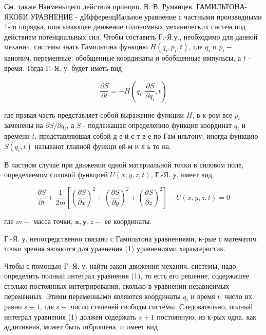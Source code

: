 \documentclass[10pt]{article}
\begin{document}
См. также Наименьщего действия принцип. В. В. Румянцев. ГАМИЛЬТОНА-ЯКОБИ УРАВНЕНИЕ - дИфференцИальное уравнение с частными производными 1-го порядка, описывающее движение голономных механических систем под действием потенциальных сил. Чтобы составить Г.-Я.у., необходимо для данной механич. системы знать Гамильтона функцию $H\left(q_{i}, p_{i}, t\right)$, где $q_{i}$ и $p_{i}-$ канонич. переменные: обобщенные координаты и обобщенные импульсы, а $t$ - время. Тогда Г.-Я. у. будет иметь вид



\[

\frac{\partial S}{\partial t}=-H\left(q_{i}, \frac{\partial S}{\partial q_{i}}, t\right)

\]



где правая часть представляет собой выражение функции $H$, в к-ром все $p_{i}$ заменены на $\partial S / \partial q_{i}$, а $S$ - подлежащая определению функция координат $q_{i}$ и времени $t$, представляюшая собой д е й с т в е по Гам ильтону; иногда функцию $S\left(q_{i}, t\right)$ называют главной функци ей м и л ь то на.



В частном случае при движении одной материальной точки в силовом поле, определяемом силовой функцией $U(x, y, z, t)$, Г.-Я. у. имеет вид



\[

\frac{\partial S}{\partial t}+\frac{1}{2 m}\left[\left(\frac{\partial S}{\partial x}\right)^{2}+\left(\frac{\partial S}{\partial y}\right)^{2}+\left(\frac{\partial S}{\partial z}\right)^{2}\right]-U(x, y, z, t)=0

\]



где $m-$ масса точки, $\boldsymbol{x}, \boldsymbol{y}, z-$ ее координаты.



Г.-Я. у. непосредственно связано с Гамильтона уравнениями, к-рые с математич. точки зрения являются для уравнения (1) уравнениями характеристик.



Чтобы с помощью Г.-Я. у. найти закон движения механич. системы, надо определить полный интеграл уравнения (1), то есть его решение, содержашее столько постоянных интегрирования, сколько в уравнении независимых переменных. Этими переменными являются координаты $q_{i}$ и время $t$; число их равно $s+1$, где $s-$ число степеней свободы системы. Следовательно, полный интеграл уравнения (1) должен содержать $s+1$ постоянную, из к-рых одна, как аддитивная, может быть отброшена, и имеет вид
\end{document}
